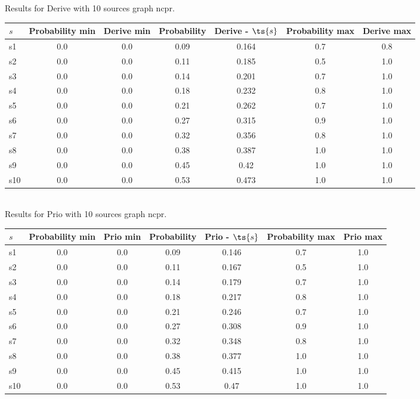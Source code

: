 \documentclass{article}
\begin{document}
\noindent Results for Derive with 10 sources graph ncpr.

\noindent\begin{tabular}{|l|c|c|c|c|c|c|}
\hline
$s$& Probability min & Derive min & Probability & Derive - $\ts{s}$ & Probability max & Derive max\\
\hline
s1 &0.0 & 0.0 & 0.09 & 0.164 & 0.7 & 0.8\\
\hline
s2 &0.0 & 0.0 & 0.11 & 0.185 & 0.5 & 1.0\\
\hline
s3 &0.0 & 0.0 & 0.14 & 0.201 & 0.7 & 1.0\\
\hline
s4 &0.0 & 0.0 & 0.18 & 0.232 & 0.8 & 1.0\\
\hline
s5 &0.0 & 0.0 & 0.21 & 0.262 & 0.7 & 1.0\\
\hline
s6 &0.0 & 0.0 & 0.27 & 0.315 & 0.9 & 1.0\\
\hline
s7 &0.0 & 0.0 & 0.32 & 0.356 & 0.8 & 1.0\\
\hline
s8 &0.0 & 0.0 & 0.38 & 0.387 & 1.0 & 1.0\\
\hline
s9 &0.0 & 0.0 & 0.45 & 0.42 & 1.0 & 1.0\\
\hline
s10 &0.0 & 0.0 & 0.53 & 0.473 & 1.0 & 1.0\\
\hline
\end{tabular}\\

\noindent Results for Prio with 10 sources graph ncpr.

\noindent\begin{tabular}{|l|c|c|c|c|c|c|}
\hline
$s$& Probability min & Prio min & Probability & Prio - $\ts{s}$ & Probability max & Prio max\\
\hline
s1 &0.0 & 0.0 & 0.09 & 0.146 & 0.7 & 1.0\\
\hline
s2 &0.0 & 0.0 & 0.11 & 0.167 & 0.5 & 1.0\\
\hline
s3 &0.0 & 0.0 & 0.14 & 0.179 & 0.7 & 1.0\\
\hline
s4 &0.0 & 0.0 & 0.18 & 0.217 & 0.8 & 1.0\\
\hline
s5 &0.0 & 0.0 & 0.21 & 0.246 & 0.7 & 1.0\\
\hline
s6 &0.0 & 0.0 & 0.27 & 0.308 & 0.9 & 1.0\\
\hline
s7 &0.0 & 0.0 & 0.32 & 0.348 & 0.8 & 1.0\\
\hline
s8 &0.0 & 0.0 & 0.38 & 0.377 & 1.0 & 1.0\\
\hline
s9 &0.0 & 0.0 & 0.45 & 0.415 & 1.0 & 1.0\\
\hline
s10 &0.0 & 0.0 & 0.53 & 0.47 & 1.0 & 1.0\\
\hline
\end{tabular}\\
\end{document}
